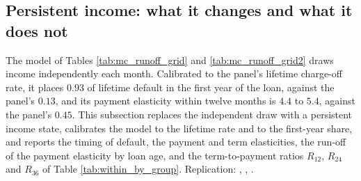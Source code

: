 \subsection{Persistent income: what it changes and what it does not}\label{appendix:persistent}

The model of Tables \ref{tab:mc_runoff_grid} and \ref{tab:mc_runoff_grid2} draws income independently each month. Calibrated to the panel's lifetime charge-off rate, it places $0.93$ of lifetime default in the first year of the loan, against the panel's $0.13$, and its payment elasticity within twelve months is $4.4$ to $5.4$, against the panel's $0.45$. This subsection replaces the independent draw with a persistent income state, calibrates the model to the lifetime rate and to the first-year share, and reports the timing of default, the payment and term elasticities, the run-off of the payment elasticity by loan age, and the term-to-payment ratios $R_{12}$, $R_{24}$ and $R_{36}$ of Table \ref{tab:within_by_group}. Replication: , , .

